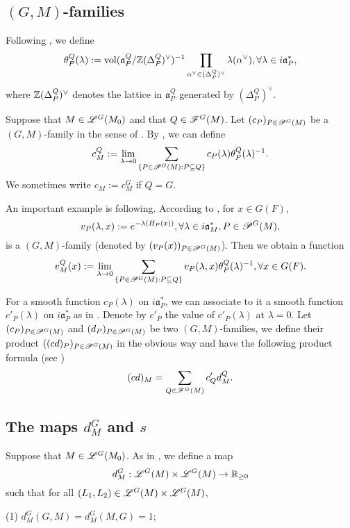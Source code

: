 \documentclass[a4paper]{amsart}
\newcommand{\fa}{{\mathfrak{a}}} \newcommand{\fb}{{\mathfrak{b}}}\newcommand{\fc}{{\mathfrak{c}}} \newcommand{\fd}{{\mathfrak{d}}}
\newcommand{\vol}{{\mathrm{vol}}}                   \newcommand{\Vol}{{\mathrm{Vol}}}
\theoremstyle{definition}
\theoremstyle{remark}
\numberwithin{equation}{subsection}
\begin{document}
\subsection{$(G,M)$-families}
Following \cite[p. 15]{MR625344}, we define
$$ \theta_P^Q(\lambda):=\vol(\fa_P^Q/\BZ(\Delta_P^Q)^\vee)^{-1}\prod_{\alpha^\vee\in(\Delta_P^Q)^\vee} \lambda(\alpha^\vee), \forall \lambda\in i\fa_P^\ast, $$
where ${\mathbb {Z}}(\Delta_P^Q)^\vee$ denotes the lattice in $\fa_P^Q$ generated by $(\Delta_P^Q)^\vee$. 

Suppose that $M\in\mathscr{L}^G(M_0)$ and that $Q\in\mathscr{F}^G(M)$. Let $(c_P)_{P\in\mathscr{P}^G(M)}$ be a $(G,M)$-family in the sense of \cite[p. 36]{MR625344}. By \cite[Lemma 6.2]{MR625344}, we can define
$$ c_M^Q:=\lim_{\lambda\rightarrow 0} \sum_{\{P\in\mathscr{P}^G(M): P\subseteq Q\}} c_P(\lambda) \theta_P^Q(\lambda)^{-1}. $$
We sometimes write $c_M:=c_M^G$ if $Q=G$. 

An important example is following. According to \cite[p. 40-41]{MR625344}, for $x\in G(F)$, 
$$ v_P(\lambda,x):=e^{-\lambda(H_P(x))}, \forall \lambda\in i\fa_M^\ast, P\in\msp^G(M), $$
is a $(G,M)$-family (denoted by $(v_P(x))_{P\in\mathscr{P}^G(M)}$). Then we obtain a function
\begin{equation}\label{localwtfn}
 v_M^Q(x):=\lim_{\lambda\rightarrow 0} \sum_{\{P\in\mathscr{P}^G(M): P\subseteq Q\}} v_P(\lambda,x) \theta_P^Q(\lambda)^{-1}, \forall x\in G(F). 
 \end{equation}

For a smooth function $c_P(\lambda)$ on $i\fa_P^\ast$, we can associate to it a smooth function $c'_P(\lambda)$ on $i\fa_P^\ast$ as in \cite[(6.3) in \S6]{MR625344}. Denote by $c'_P$ the value of $c'_P(\lambda)$ at $\lambda=0$. Let $(c_P)_{P\in\mathscr{P}^G(M)}$ and $(d_P)_{P\in\mathscr{P}^G(M)}$ be two $(G,M)$-families, we define their product $((cd)_P)_{P\in\mathscr{P}^G(M)}$ in the obvious way and have the following product formula (see \cite[Lemma 6.3]{MR625344})
\begin{equation}\label{split6.3}
 (cd)_M=\sum_{Q\in\mathscr{F}^G(M)} c'_Q d_M^Q. 
\end{equation}

\subsection{The maps $d_M^G$ and $s$}\label{gmmaps}
Suppose that $M\in\mathscr{L}^G(M_0)$. As in \cite[p. 356]{MR928262}, we define a map
$$ d_M^G: \mathscr{L}^G(M)\times\mathscr{L}^G(M)\rightarrow{\mathbb {R}}_{\geq 0} $$
such that for all $(L_1,L_2)\in\mathscr{L}^G(M)\times\mathscr{L}^G(M)$, 

(1) $d_M^G(G,M)=d_M^G(M,G)=1$; 
\end{document}
